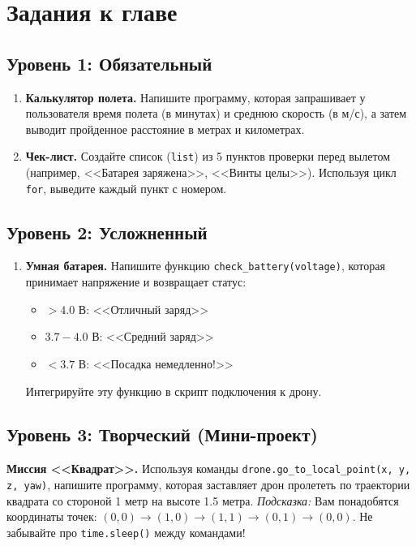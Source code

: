 \section{Задания к главе}

\subsection*{Уровень 1: Обязательный}
\begin{enumerate}
    \item \textbf{Калькулятор полета.} Напишите программу, которая запрашивает у пользователя время полета (в минутах) и среднюю скорость (в м/с), а затем выводит пройденное расстояние в метрах и километрах.
    \item \textbf{Чек-лист.} Создайте список (\texttt{list}) из 5 пунктов проверки перед вылетом (например, <<Батарея заряжена>>, <<Винты целы>>). Используя цикл \texttt{for}, выведите каждый пункт с номером.
\end{enumerate}

\subsection*{Уровень 2: Усложненный}
\begin{enumerate}
    \item \textbf{Умная батарея.} Напишите функцию \texttt{check\_battery(voltage)}, которая принимает напряжение и возвращает статус:
    \begin{itemize}
        \item $> 4.0$ В: <<Отличный заряд>>
        \item $3.7 - 4.0$ В: <<Средний заряд>>
        \item $< 3.7$ В: <<Посадка немедленно!>>
    \end{itemize}
    Интегрируйте эту функцию в скрипт подключения к дрону.
\end{enumerate}

\subsection*{Уровень 3: Творческий (Мини-проект)}
\textbf{Миссия <<Квадрат>>.} 
Используя команды \texttt{drone.go\_to\_local\_point(x, y, z, yaw)}, напишите программу, которая заставляет дрон пролететь по траектории квадрата со стороной 1 метр на высоте 1.5 метра.
\textit{Подсказка:} Вам понадобятся координаты точек: $(0,0) \to (1,0) \to (1,1) \to (0,1) \to (0,0)$. Не забывайте про \texttt{time.sleep()} между командами!
